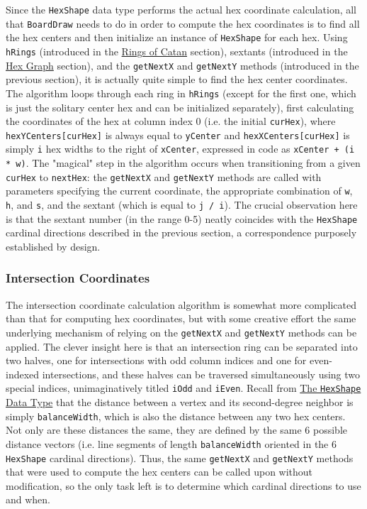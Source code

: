 \documentclass[pageno]{jpaper}
\begin{document}
\begin{doublespacing}
Since the \lstinline$HexShape$ data type performs the actual hex coordinate calculation, all that \lstinline$BoardDraw$ needs to do in order to compute the hex coordinates is to find all the hex centers and then initialize an instance of \lstinline$HexShape$ for each hex. Using \lstinline$hRings$ (introduced in the \hyperlink{sec:rings_of_catan}{Rings of Catan} section), sextants (introduced in the \hyperlink{sec:hex_graph}{Hex Graph} section), and the \lstinline$getNextX$ and \lstinline$getNextY$ methods (introduced in the previous section), it is actually quite simple to find the hex center coordinates. The algorithm loops through each ring in \lstinline$hRings$ (except for the first one, which is just the solitary center hex and can be initialized separately), first calculating the coordinates of the hex at column index 0 (i.e. the initial \lstinline$curHex$), where \lstinline$hexYCenters[curHex]$ is always equal to \lstinline$yCenter$ and \lstinline$hexXCenters[curHex]$ is simply \lstinline$i$ hex widths to the right of \lstinline$xCenter$, expressed in code as \lstinline$xCenter + (i * w)$. The "magical" step in the algorithm occurs when transitioning from a given \lstinline$curHex$ to \lstinline$nextHex$: the \lstinline$getNextX$ and \lstinline$getNextY$ methods are called with parameters specifying the current coordinate, the appropriate combination of \lstinline$w$, \lstinline$h$, and \lstinline$s$, and the sextant (which is equal to \lstinline$j / i$). The crucial observation here is that the sextant number (in the range 0-5) neatly coincides with the \lstinline$HexShape$ cardinal directions described in the previous section, a correspondence purposely established by design.

\hypertarget{sec:intersection_coordinates}{}
\subsubsection{Intersection Coordinates}

The intersection coordinate calculation algorithm is somewhat more complicated than that for computing hex coordinates, but with some creative effort the same underlying mechanism of relying on the \lstinline$getNextX$ and \lstinline$getNextY$ methods can be applied. The clever insight here is that an intersection ring can be separated into two halves, one for intersections with odd column indices and one for even-indexed intersections, and these halves can be traversed simultaneously using two special indices, unimaginatively titled \lstinline$iOdd$ and \lstinline$iEven$. Recall from \hyperlink{sec:the_hexshape_data_type}{The \lstinline$HexShape$ Data Type} that the distance between a vertex and its second-degree neighbor is simply \lstinline$balanceWidth$, which is also the distance between any two hex centers. Not only are these distances the same, they are defined by the same 6 possible distance vectors (i.e. line segments of length \lstinline$balanceWidth$ oriented in the 6 \lstinline$HexShape$ cardinal directions). Thus, the same \lstinline$getNextX$ and \lstinline$getNextY$ methods that were used to compute the hex centers can be called upon without modification, so the only task left is to determine which cardinal directions to use and when.


\end{doublespacing}
\end{document}
